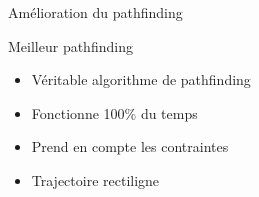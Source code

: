 \documentclass{beamer}
\begin{document}
{\begin{frame}{Amélioration du pathfinding}
    \begin{block}{Meilleur pathfinding}
        \begin{itemize}
            \item[\bullet] Véritable algorithme de pathfinding
            \item[\bullet] Fonctionne 100\% du temps
            \item[\bullet] Prend en compte les contraintes
            \item[\bullet] Trajectoire rectiligne
        \end{itemize}
    \end{block}
\end{frame}

}
\end{document}
